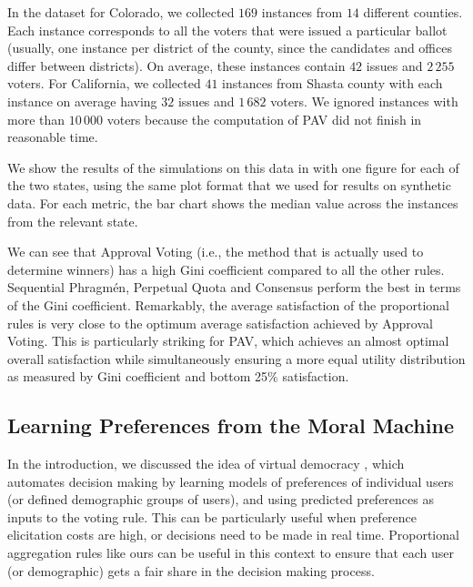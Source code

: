\documentclass[10pt]{scrartcl}
\theoremstyle{plain}
\theoremstyle{definition}
\begin{document}
In the dataset for Colorado, we collected $169$ instances from $14$ different counties. Each instance corresponds to all the voters that were issued a particular ballot (usually, one instance per district of the county, since the candidates and offices differ between districts). On average, these instances contain $42$ issues and $2\,255$ voters. For California, we collected $41$ instances from Shasta county with each instance on average having $32$ issues and $1\,682$ voters. We ignored instances with more than $10\,000$ voters because the computation of PAV did not finish in reasonable time. 

We show the results of the simulations on this data in  with one figure for each of the two states, using the same plot format that we used for results on synthetic data. For each metric, the bar chart shows the median value across the instances from the relevant state.

We can see that Approval Voting (i.e., the method that is actually used to determine winners) has a high Gini coefficient compared to all the other rules. Sequential Phragm\'en, Perpetual Quota and Consensus perform the best in terms of the Gini coefficient. Remarkably, the average satisfaction of the proportional rules is very close to the optimum average satisfaction achieved by Approval Voting. This is particularly striking for PAV, which achieves an almost optimal overall satisfaction while simultaneously ensuring a more equal utility distribution as measured by Gini coefficient and bottom 25\% satisfaction.


\subsection{Learning Preferences from the Moral Machine}
\label{sec:experiments:learning}

In the introduction, we discussed the idea of virtual democracy \citep{noothigattu2018voting, freedman2020adapting, mohsin2021making}, which automates decision making by learning models of preferences of individual users (or defined demographic groups of users), and using predicted preferences as inputs to the voting rule.
This can be particularly useful when preference elicitation costs are high, or decisions need to be made in real time.
Proportional aggregation rules like ours can be useful in this context to ensure that each user (or demographic) gets a fair share in the decision making process. 
\end{document}
